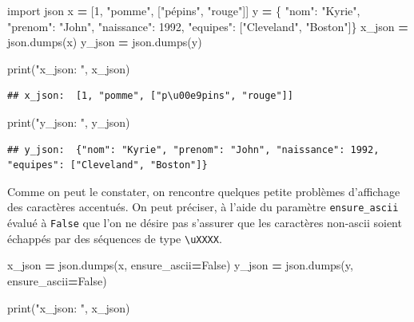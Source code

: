 \documentclass[12pt,]{book}
\newenvironment{Shaded}{\begin{snugshade}}{\end{snugshade}}
\newcommand{\DecValTok}[1]{\textcolor[rgb]{0.00,0.00,0.81}{#1}}
\newcommand{\StringTok}[1]{\textcolor[rgb]{0.31,0.60,0.02}{#1}}
\newcommand{\ImportTok}[1]{#1}
\newcommand{\VariableTok}[1]{\textcolor[rgb]{0.00,0.00,0.00}{#1}}
\newcommand{\OperatorTok}[1]{\textcolor[rgb]{0.81,0.36,0.00}{\textbf{#1}}}
\newcommand{\BuiltInTok}[1]{#1}
\newcommand{\NormalTok}[1]{#1}
\numberwithin{equation}{section}
\numberwithin{countremarque}{section}
\begin{document}
\begin{Shaded}
\begin{Highlighting}[]
\ImportTok{import}\NormalTok{ json}
\NormalTok{x }\OperatorTok{=}\NormalTok{ [}\DecValTok{1}\NormalTok{, }\StringTok{"pomme"}\NormalTok{, [}\StringTok{"pépins"}\NormalTok{, }\StringTok{"rouge"}\NormalTok{]]}
\NormalTok{y }\OperatorTok{=}\NormalTok{ \{ }\StringTok{"nom"}\NormalTok{: }\StringTok{"Kyrie"}\NormalTok{,}
  \StringTok{"prenom"}\NormalTok{: }\StringTok{"John"}\NormalTok{,}
  \StringTok{"naissance"}\NormalTok{: }\DecValTok{1992}\NormalTok{,}
  \StringTok{"equipes"}\NormalTok{: [}\StringTok{"Cleveland"}\NormalTok{, }\StringTok{"Boston"}\NormalTok{]\}}
\NormalTok{x_json }\OperatorTok{=}\NormalTok{ json.dumps(x)}
\NormalTok{y_json }\OperatorTok{=}\NormalTok{ json.dumps(y)}

\BuiltInTok{print}\NormalTok{(}\StringTok{"x_json: "}\NormalTok{, x_json)}
\end{Highlighting}
\end{Shaded}

\begin{lstlisting}
## x_json:  [1, "pomme", ["p\u00e9pins", "rouge"]]
\end{lstlisting}

\begin{Shaded}
\begin{Highlighting}[]
\BuiltInTok{print}\NormalTok{(}\StringTok{"y_json: "}\NormalTok{, y_json)}
\end{Highlighting}
\end{Shaded}

\begin{lstlisting}
## y_json:  {"nom": "Kyrie", "prenom": "John", "naissance": 1992, "equipes": ["Cleveland", "Boston"]}
\end{lstlisting}

Comme on peut le constater, on rencontre quelques petite problèmes
d'affichage des caractères accentués. On peut préciser, à l'aide du
paramètre \texttt{ensure\_ascii} évalué à \texttt{False} que l'on ne
désire pas s'assurer que les caractères non-ascii soient échappés par
des séquences de type \texttt{\textbackslash{}uXXXX}.

\begin{Shaded}
\begin{Highlighting}[]
\NormalTok{x_json }\OperatorTok{=}\NormalTok{ json.dumps(x, ensure_ascii}\OperatorTok{=}\VariableTok{False}\NormalTok{)}
\NormalTok{y_json }\OperatorTok{=}\NormalTok{ json.dumps(y, ensure_ascii}\OperatorTok{=}\VariableTok{False}\NormalTok{)}

\BuiltInTok{print}\NormalTok{(}\StringTok{"x_json: "}\NormalTok{, x_json)}
\end{Highlighting}
\end{Shaded}
\end{document}
